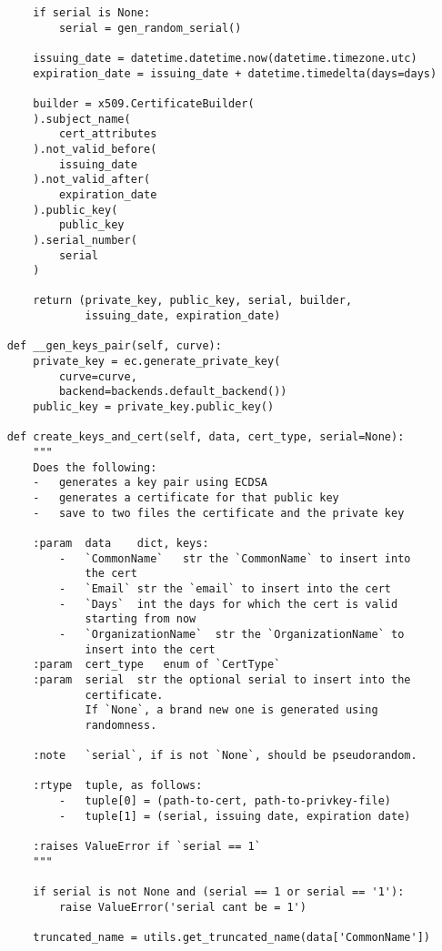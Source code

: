 \begin{verbatim}
        if serial is None:
            serial = gen_random_serial()

        issuing_date = datetime.datetime.now(datetime.timezone.utc)
        expiration_date = issuing_date + datetime.timedelta(days=days)

        builder = x509.CertificateBuilder(
        ).subject_name(
            cert_attributes
        ).not_valid_before(
            issuing_date
        ).not_valid_after(
            expiration_date
        ).public_key(
            public_key
        ).serial_number(
            serial
        )

        return (private_key, public_key, serial, builder,
                issuing_date, expiration_date)        

    def __gen_keys_pair(self, curve):
        private_key = ec.generate_private_key(
            curve=curve,
            backend=backends.default_backend())
        public_key = private_key.public_key()

    def create_keys_and_cert(self, data, cert_type, serial=None):
        """
        Does the following:
        -   generates a key pair using ECDSA
        -   generates a certificate for that public key
        -   save to two files the certificate and the private key

        :param  data    dict, keys:
            -   `CommonName`   str the `CommonName` to insert into
                the cert
            -   `Email` str the `email` to insert into the cert
            -   `Days`  int the days for which the cert is valid
                starting from now
            -   `OrganizationName`  str the `OrganizationName` to
                insert into the cert
        :param  cert_type   enum of `CertType`
        :param  serial  str the optional serial to insert into the
                certificate.
                If `None`, a brand new one is generated using
                randomness.

        :note   `serial`, if is not `None`, should be pseudorandom.

        :rtype  tuple, as follows:
            -   tuple[0] = (path-to-cert, path-to-privkey-file)
            -   tuple[1] = (serial, issuing date, expiration date)

        :raises ValueError if `serial == 1`
        """

        if serial is not None and (serial == 1 or serial == '1'):
            raise ValueError('serial cant be = 1')

        truncated_name = utils.get_truncated_name(data['CommonName'])


\end{verbatim}
